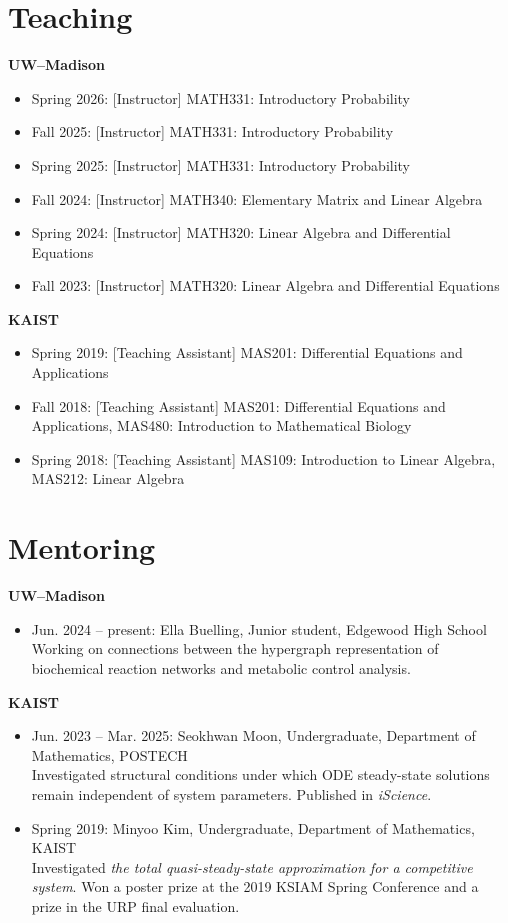 \documentclass[margin,line]{res}
\newcommand{\vspacesection}{\vspace*{-1.5mm}}
\begin{document}
\begin{resume}
\section{\sc Teaching}
\textbf{UW--Madison}
\begin{itemize}
    \item Spring 2026: [Instructor] MATH331: Introductory Probability
    \item Fall 2025: [Instructor] MATH331: Introductory Probability
    \item Spring 2025: [Instructor] MATH331: Introductory Probability
    \item Fall 2024: [Instructor] MATH340: Elementary Matrix and Linear Algebra
    \item Spring 2024: [Instructor] MATH320: Linear Algebra and Differential Equations
    \item Fall 2023: [Instructor] MATH320: Linear Algebra and Differential Equations
\end{itemize}
\vspacesection

\textbf{KAIST}
\begin{itemize}
    \item Spring 2019: [Teaching Assistant] MAS201: Differential Equations and Applications
    \item Fall 2018: [Teaching Assistant] MAS201: Differential Equations and Applications, MAS480: Introduction to Mathematical Biology
    \item Spring 2018: [Teaching Assistant] MAS109: Introduction to Linear Algebra,  MAS212: Linear Algebra
\end{itemize}

\section{\sc Mentoring}
\textbf{UW--Madison}
\begin{itemize}
    \item Jun. 2024 – present: Ella Buelling, Junior student, Edgewood High School\\
    Working on connections between the hypergraph representation of biochemical reaction networks and metabolic control analysis.
\end{itemize}
\vspacesection
\textbf{KAIST}
\begin{itemize}
    \item Jun. 2023 – Mar. 2025: Seokhwan Moon, Undergraduate, Department of Mathematics, POSTECH\\
    Investigated structural conditions under which ODE steady-state solutions remain independent of system parameters. Published in \textit{iScience}.
    \item Spring 2019: Minyoo Kim, Undergraduate, Department of Mathematics, KAIST\\
    Investigated \textit{the total quasi-steady-state approximation for a competitive system}. Won a poster prize at the 2019 KSIAM Spring Conference and a prize in the URP final evaluation.
\end{itemize}
\vspacesection

\end{resume}
\end{document}
